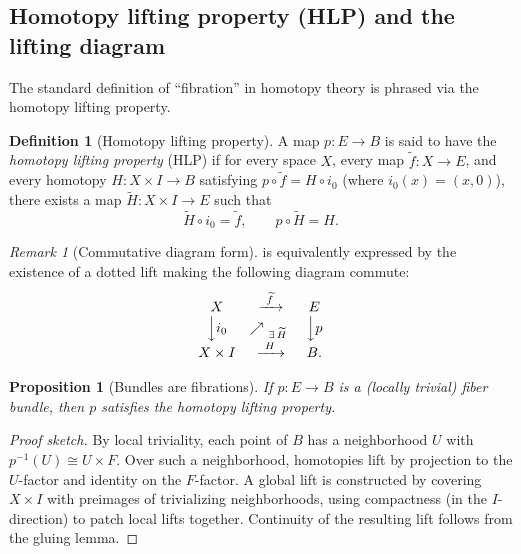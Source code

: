 \documentclass[11pt,a4paper]{article}
\newtheorem{proposition}[theorem]{Proposition}
\theoremstyle{definition}
\newtheorem{definition}[theorem]{Definition}
\theoremstyle{remark}
\newtheorem{remark}[theorem]{Remark}
\begin{document}
\subsection{Homotopy lifting property (HLP) and the lifting diagram}
\label{sec:hlp}

The standard definition of ``fibration'' in homotopy theory is phrased via the homotopy lifting property.

\begin{definition}[Homotopy lifting property]
\label{def:hlp}
A map \(p:E\to B\) is said to have the \emph{homotopy lifting property} (HLP) if for every space \(X\), every map \(\widetilde f:X\to E\), and every homotopy \(H:X\times I\to B\) satisfying \(p\circ \widetilde f = H\circ i_0\) (where \(i_0(x)=(x,0)\)), there exists a map \(\widetilde H:X\times I\to E\) such that
\[
\widetilde H\circ i_0=\widetilde f,
\qquad
p\circ \widetilde H = H.
\]
\end{definition}

\begin{remark}[Commutative diagram form]
\label{rem:hlp-diagram}
 is equivalently expressed by the existence of a dotted lift making the following diagram commute:
\[
\begin{array}{ccc}
X & \xrightarrow{\ \widetilde f\ } & E \\
\Big\downarrow {i_0} & \nearrow_{\ \exists\,\widetilde H\ } & \Big\downarrow {p} \\
X\times I & \xrightarrow{\ H\ } & B.
\end{array}
\]
\end{remark}

\begin{proposition}[Bundles are fibrations]
\label{prop:bundle-fibration}
If \(p:E\to B\) is a (locally trivial) fiber bundle, then \(p\) satisfies the homotopy lifting property.
\end{proposition}

\begin{proof}[Proof sketch]
By local triviality, each point of \(B\) has a neighborhood \(U\) with \(p^{-1}(U)\cong U\times F\). Over such a neighborhood, homotopies lift by projection to the \(U\)-factor and identity on the \(F\)-factor. A global lift is constructed by covering \(X\times I\) with preimages of trivializing neighborhoods, using compactness (in the \(I\)-direction) to patch local lifts together. Continuity of the resulting lift follows from the gluing lemma.
\end{proof}
\end{document}
